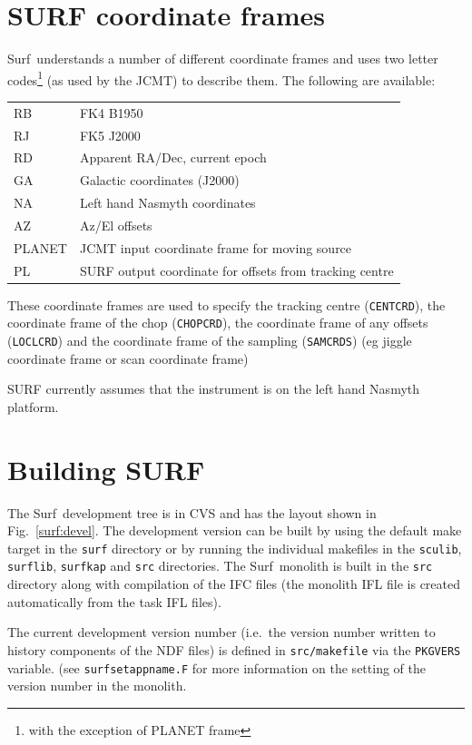 \documentclass[twoside,11pt]{article}
\newcommand{\scusoft}          {{\sc Surf}}
\renewcommand{\_}{\texttt{\symbol{95}}}
\begin{document}
\section{SURF coordinate frames\label{app:frames}}

\scusoft\ understands a number of different coordinate frames and uses
two letter codes\footnote{with the exception of PLANET frame} 
(as used by the JCMT) to describe them. The following
are available:

\begin{tabular}{ll}
RB & FK4 B1950\\
RJ & FK5 J2000\\
RD & Apparent RA/Dec, current epoch\\
GA & Galactic coordinates (J2000) \\
NA & Left hand Nasmyth coordinates \\
AZ & Az/El offsets \\
PLANET & JCMT input coordinate frame for moving source \\
PL & SURF output coordinate for offsets from tracking centre\\
\end{tabular}

These coordinate frames are used to specify the tracking centre
(\texttt{CENT\_CRD}), the coordinate frame of the chop (\texttt{CHOP\_CRD}),
the coordinate frame of any offsets (\texttt{LOCL\_CRD}) and the coordinate
frame of the sampling (\texttt{SAM\_CRDS}) (eg jiggle coordinate frame or scan
coordinate frame)

SURF currently assumes that the instrument is on the left hand Nasmyth
platform.

\section{Building SURF}

The \scusoft\ development tree is in CVS and has the layout shown in
Fig.\ \ref{surf:devel}. The development version can be built 
by using the default make target in the \texttt{surf} directory or
by running the individual makefiles in the \texttt{sculib}, \texttt{surflib},
\texttt{surf\_kap} and \texttt{src} directories. The \scusoft\ monolith is
built in the \texttt{src} directory along with compilation of the IFC files
(the monolith IFL file is created automatically from the task IFL files).

The current development version number (i.e.\ the version number written to
history components of the NDF files) is defined in \texttt{src/makefile}
via the \texttt{PKG\_VERS} variable. (see \texttt{surf\_set\_app\_name.F} for
more information on the setting of the version number in the monolith.
\end{document}

